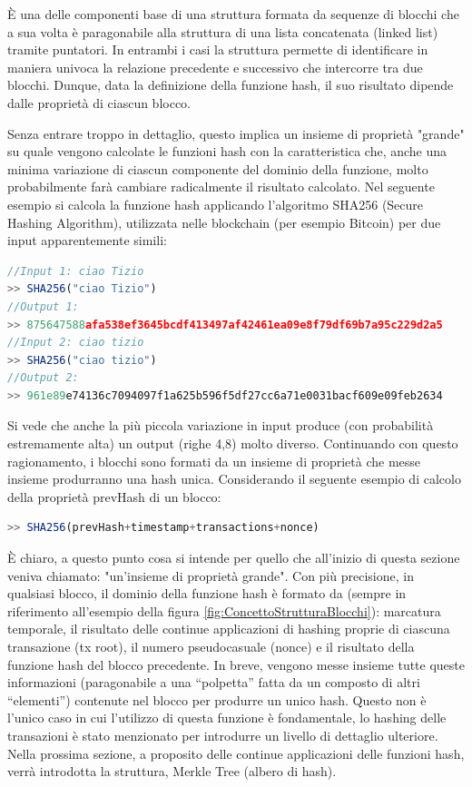 È una delle componenti base di una struttura formata da sequenze di blocchi che a sua volta è paragonabile alla struttura di una lista concatenata (linked list) tramite puntatori. In entrambi i casi la struttura permette di identificare in maniera univoca la relazione precedente e successivo che intercorre tra due blocchi. Dunque, data la definizione della funzione hash, il suo risultato dipende dalle proprietà di ciascun blocco.

Senza entrare troppo in dettaglio, questo implica un insieme di proprietà "grande" su quale vengono calcolate le funzioni hash con la caratteristica che, anche una minima variazione di ciascun componente del dominio della funzione, molto probabilmente farà cambiare radicalmente il risultato calcolato.
Nel seguente esempio si calcola la funzione hash applicando l'algoritmo SHA256 (Secure Hashing Algorithm), utilizzata nelle blockchain (per esempio Bitcoin) per due input apparentemente simili: 

\begin{lstlisting}[caption={Esempio di calcolo della funzione hash SHA256},language=JavaScript]
//Input 1: ciao Tizio
>> SHA256("ciao Tizio")
//Output 1: 
>> 875647588afa538ef3645bcdf413497af42461ea09e8f79df69b7a95c229d2a5
//Input 2: ciao tizio
>> SHA256("ciao tizio")
//Output 2: 
>> 961e89e74136c7094097f1a625b596f5df27cc6a71e0031bacf609e09feb2634
\end{lstlisting}

Si vede che anche la più piccola variazione in input produce (con probabilità estremamente alta) un output (righe 4,8) molto diverso.
Continuando con questo ragionamento, i blocchi sono formati da un insieme di proprietà che messe insieme produrranno una hash unica. Considerando il seguente esempio di calcolo della proprietà prevHash di un blocco:

\begin{lstlisting}[caption={Esempio di calcolo della funzione hash in base alle proprietà del blocco},language=JavaScript]
>> SHA256(prevHash+timestamp+transactions+nonce)
\end{lstlisting}

È chiaro, a questo punto cosa si intende per quello che all'inizio di questa sezione veniva chiamato: "un'insieme di proprietà grande". Con più precisione, in qualsiasi blocco, il dominio della funzione hash è formato da (sempre in riferimento all'esempio della figura \ref{fig:ConcettoStrutturaBlocchi}): marcatura temporale, il risultato delle continue applicazioni di hashing proprie di ciascuna transazione (tx root), il numero pseudocasuale (nonce) e il risultato della funzione hash del blocco precedente. In breve, vengono messe insieme tutte queste informazioni (paragonabile a una “polpetta” fatta da un composto di altri “elementi”) contenute nel blocco per produrre un unico hash. Questo non è l'unico caso in cui l'utilizzo di questa funzione è fondamentale, lo hashing delle transazioni è stato menzionato per introdurre un livello di dettaglio ulteriore. Nella prossima sezione, a proposito delle continue applicazioni delle funzioni hash, verrà introdotta la struttura, Merkle Tree (albero di hash).

